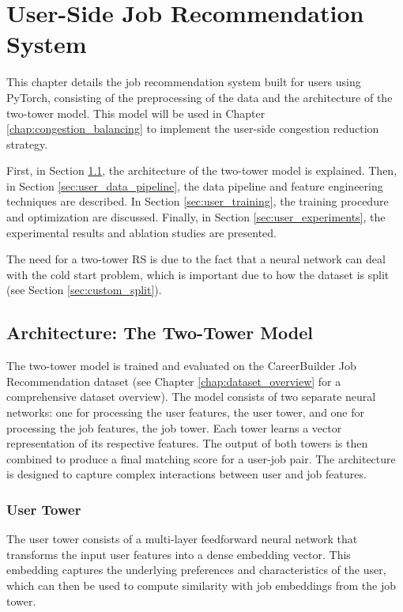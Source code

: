 \chapter{User-Side Job Recommendation System}
\label{chap:user_recommendation}

This chapter details the job recommendation system built for users using PyTorch, consisting of the preprocessing of the data and the architecture of the two-tower model. This model will be used in Chapter \ref{chap:congestion_balancing} to implement the user-side congestion reduction strategy.

First, in Section \ref{sec:user_arch}, the architecture of the two-tower model is explained. Then, in Section \ref{sec:user_data_pipeline}, the data pipeline and feature engineering techniques are described. In Section \ref{sec:user_training}, the training procedure and optimization are discussed. Finally, in Section \ref{sec:user_experiments}, the experimental results and ablation studies are presented.

The need for a two-tower \gls{RS} is due to the fact that a neural network can deal with the cold start problem, which is important due to how the dataset is split (see Section \ref{sec:custom_split}).

\section{Architecture: The Two-Tower Model}
\label{sec:user_arch}

The two-tower model is trained and evaluated on the CareerBuilder Job Recommendation dataset (see Chapter \ref{chap:dataset_overview} for a comprehensive dataset overview). The model consists of two separate neural networks: one for processing the user features, the user tower, and one for processing the job features, the job tower. Each tower learns a vector representation of its respective features. The output of both towers is then combined to produce a final matching score for a user-job pair. The architecture is designed to capture complex interactions between user and job features.

\subsection{User Tower}
\label{sec:user_tower}

The user tower consists of a multi-layer feedforward neural network that transforms the input user features into a dense embedding vector. This embedding captures the underlying preferences and characteristics of the user, which can then be used to compute similarity with job embeddings from the job tower.

